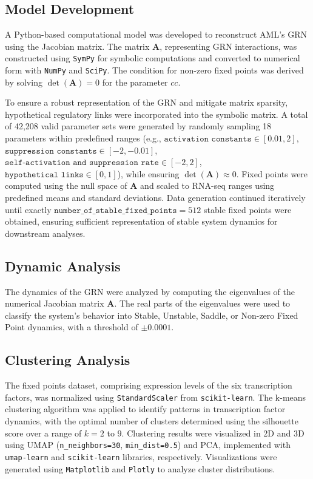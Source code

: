 \documentclass[a4paper,12pt]{article}
\begin{document}
\subsection{Model Development}
\label{subsec:model_development}
A Python-based computational model was developed to reconstruct AML’s GRN using the Jacobian matrix. The matrix \( \mathbf{A} \), representing GRN interactions, was constructed using \texttt{SymPy} for symbolic computations and converted to numerical form with \texttt{NumPy} and \texttt{SciPy}. The condition for non-zero fixed points was derived by solving \( \det(\mathbf{A}) = 0 \) for the parameter \( cc \).

To ensure a robust representation of the GRN and mitigate matrix sparsity, hypothetical regulatory links were incorporated into the symbolic matrix. A total of 42,208 valid parameter sets were generated by randomly sampling 18 parameters within predefined ranges (e.g., \( \texttt{activation constants} \in [0.01, 2] \), \( \texttt{suppression constants} \in [-2, -0.01] \), \( \texttt{self-activation and suppression rate} \in [-2, 2] \), \( \texttt{hypothetical links} \in [0, 1] \)), while ensuring \( \det(\mathbf{A}) \approx 0 \). Fixed points were computed using the null space of \( \mathbf{A} \) and scaled to RNA-seq ranges using predefined means and standard deviations. Data generation continued iteratively until exactly \( \texttt{number\_of\_stable\_fixed\_points} = 512 \) stable fixed points were obtained, ensuring sufficient representation of stable system dynamics for downstream analyses.


\subsection{Dynamic Analysis}
\label{subsec:dynamic_analysis}
The dynamics of the GRN were analyzed by computing the eigenvalues of the numerical Jacobian matrix \( \mathbf{A} \). The real parts of the eigenvalues were used to classify the system’s behavior into Stable, Unstable, Saddle, or Non-zero Fixed Point dynamics, with a threshold of \( \pm 0.0001 \). 

\subsection{Clustering Analysis}
\label{subsec:clustering}
The fixed points dataset, comprising expression levels of the six transcription factors, was normalized using \texttt{StandardScaler} from \texttt{scikit-learn}. The k-means clustering algorithm was applied to identify patterns in transcription factor dynamics, with the optimal number of clusters determined using the silhouette score over a range of \( k = 2 \) to \( 9 \). Clustering results were visualized in 2D and 3D using UMAP (\texttt{n\_neighbors=30}, \texttt{min\_dist=0.5}) and PCA, implemented with \texttt{umap-learn} and \texttt{scikit-learn} libraries, respectively. Visualizations were generated using \texttt{Matplotlib} and \texttt{Plotly} to analyze cluster distributions.
\end{document}
